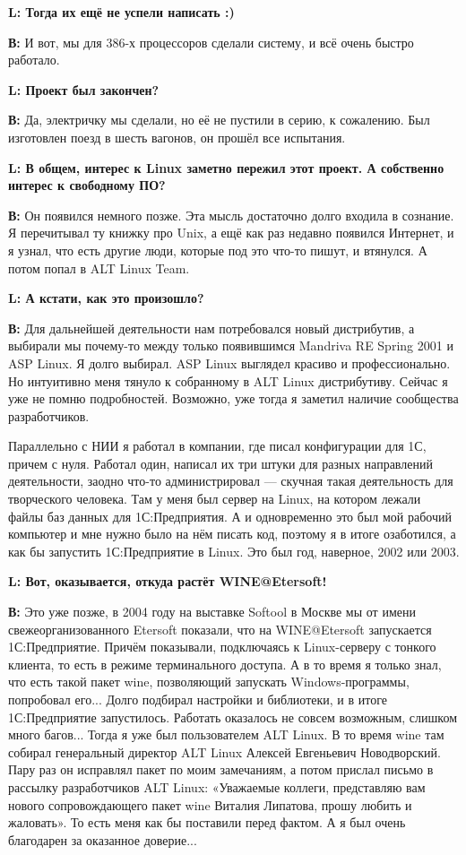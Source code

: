 \documentclass[10pt, a5paper]{article}
\begin{document}
{\noindent \bf L: Тогда их ещё не успели написать :)}

{\noindent \bf В:} И вот, мы для 386-х процессоров сделали систему, и всё очень быстро работало.

{\noindent \bf L: Проект был закончен?}

{\noindent \bf В:} Да, электричку мы сделали, но её не пустили в серию, к сожалению. Был изготовлен поезд в шесть вагонов, он прошёл все испытания.

{\noindent \bf L: В общем, интерес к Linux заметно пережил этот проект. А собственно интерес к свободному ПО?}

{\noindent \bf В:} Он появился немного позже. Эта мысль достаточно долго входила в сознание. Я перечитывал ту книжку про Unix, а ещё как раз недавно появился Интернет, и я узнал, что есть другие люди, которые под это что-то пишут, и втянулся. А потом попал в ALT Linux Team.

{\noindent \bf L: А кстати, как это произошло?}

{\noindent \bf В:} Для дальнейшей деятельности нам потребовался новый дистрибутив, а выбирали мы почему-то между только появившимся Mandriva RE Spring 2001 и ASP Linux. Я долго выбирал. ASP Linux выглядел красиво и профессионально. Но интуитивно меня тянуло к собранному в ALT Linux дистрибутиву. Сейчас я уже не помню подробностей. Возможно, уже тогда я заметил наличие сообщества разработчиков.

Параллельно с НИИ я работал в компании, где  писал конфигурации для 1С, причем с нуля. Работал один, написал их три штуки для разных направлений деятельности, заодно что-то администрировал --- скучная такая деятельность для творческого человека. Там у меня был сервер на Linux, на котором лежали файлы баз данных для 1С:Предприятия. А и одновременно это был мой рабочий компьютер и мне нужно было на нём писать код, поэтому я в итоге озаботился, а как бы запустить 1С:Предприятие в Linux. Это был год, наверное, 2002 или 2003.  

{\noindent \bf L: Вот, оказывается, откуда растёт WINE@Etersoft!}

{\noindent \bf В:} Это уже позже, в 2004 году на выставке Softool в Москве мы от имени свежеорганизованного Etersoft показали, что на  WINE@Etersoft запускается 1С:Предприятие. Причём показывали, подключаясь к Linux-серверу с тонкого клиента, то есть в режиме терминального доступа. А в то время я только знал, что есть такой пакет wine, позволяющий запускать Windows-программы, попробовал его... Долго подбирал настройки и библиотеки, и в итоге 1С:Предприятие запустилось. Работать оказалось не совсем возможным, слишком много багов... Тогда я уже был пользователем ALT Linux. В то время wine там собирал генеральный директор ALT Linux Алексей Евгеньевич Новодворский. Пару раз он исправлял пакет по моим замечаниям, а потом прислал письмо в рассылку разработчиков ALT Linux: «Уважаемые коллеги, представляю вам нового сопровождающего пакет wine Виталия Липатова, прошу любить и жаловать». То есть меня как бы поставили перед фактом. А я был очень благодарен за оказанное доверие... 
\end{document}
